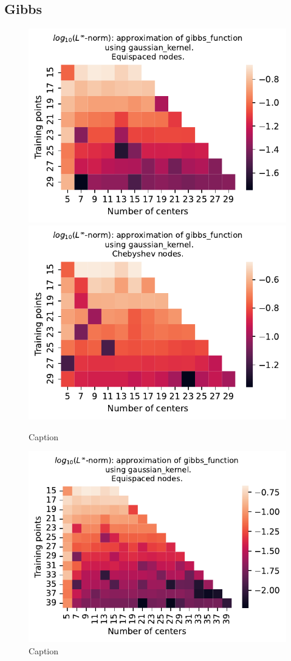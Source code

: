 \documentclass[12pt]{report} %
\begin{document}
\subsection*{Gibbs}

\begin{figure}[ht]
    \centering
    
    \includegraphics[width=.49\textwidth]{imagenes/experiments/1d/variational/gibbs_function-Kgaussian_kernel-Equi.pdf}
    \includegraphics[width=.49\textwidth]{imagenes/experiments/1d/variational/gibbs_function-Kgaussian_kernel-Cheb.pdf}
    \caption{Caption}
    \label{fig:gibbs-gaussian}
\end{figure}

\begin{figure}[ht]
    \centering
    
    \includegraphics[width=.6\textwidth]{imagenes/experiments/1d/variational/gibbs_gaussian_extended.pdf}
    \caption{Caption}
    \label{fig:gibbs-gaussian-extended}
\end{figure}
\end{document}
